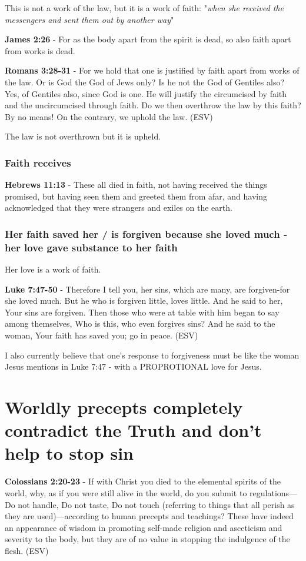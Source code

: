 \documentclass[11pt]{article}
\begin{document}
This is not a work of the law, but it is a work of faith: "\emph{when she received the messengers and sent them out by another way}"

\textbf{James 2:26} - For as the body apart from the spirit is dead, so also faith apart from works is dead.

\textbf{Romans 3:28-31} - For we hold that one is justified by faith apart from works of the law. Or is God the God of Jews only? Is he not the God of Gentiles also? Yes, of Gentiles also, since God is one. He will justify the circumcised by faith and the uncircumcised through faith. Do we then overthrow the law by this faith? By no means! On the contrary, we uphold the law. (ESV)

The law is not overthrown but it is upheld.

\subsubsection{Faith receives}
\label{sec:orgdaea78c}
\textbf{Hebrews 11:13} - These all died in faith, not having received the things promised, but having seen them and greeted them from afar, and having acknowledged that they were strangers and exiles on the earth.

\subsubsection{Her faith saved her / is forgiven because she loved much - her love gave substance to her faith}
\label{sec:orgeb899e5}
Her love is a work of faith.

\textbf{Luke 7:47-50} - Therefore I tell you, her sins, which are many, are forgiven-for she loved much. But he who is forgiven little, loves little. And he said to her, Your sins are forgiven. Then those who were at table with him began to say among themselves, Who is this, who even forgives sins? And he said to the woman, Your faith has saved you; go in peace. (ESV)

I also currently believe that one's response to forgiveness must be like the woman Jesus mentions in Luke 7:47 - with a PROPROTIONAL love for Jesus.

\section{Worldly precepts completely contradict the Truth and don't help to stop sin}
\label{sec:org96b0415}
\textbf{Colossians 2:20-23} - If with Christ you died to the elemental spirits of the world, why, as if you were still alive in the world, do you submit to regulations— Do not handle, Do not taste, Do not touch (referring to things that all perish as they are used)—according to human precepts and teachings? These have indeed an appearance of wisdom in promoting self-made religion and asceticism and severity to the body, but they are of no value in stopping the indulgence of the flesh. (ESV)
\end{document}
